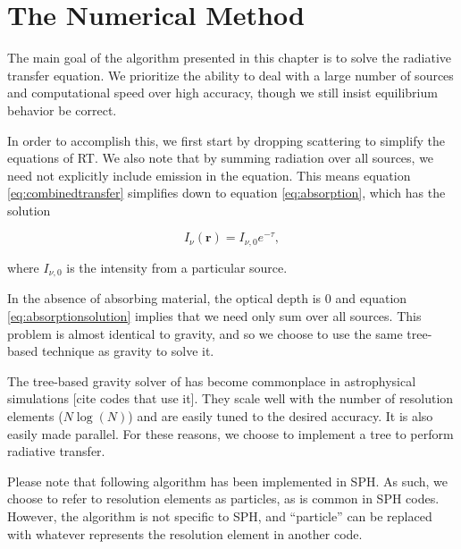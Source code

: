 \pagestyle{fancy}
\headheight 20pt
\chead{}
\lfoot{}
\cfoot{\thepage}
\rfoot{}
\renewcommand{\headrulewidth}{0.1pt}
\renewcommand{\footrulewidth}{0.1pt}

\chapter{The Numerical Method}
\label{chap:method}
\thispagestyle{fancy}

The main goal of the algorithm presented in this chapter is to solve the radiative transfer equation. We prioritize the ability to deal with a large number of sources and computational speed over high accuracy, though we still insist equilibrium behavior be correct.

In order to accomplish this, we first start by dropping scattering to simplify the equations of RT. We also note that by summing radiation over all sources, we need not explicitly include emission in the equation. This means equation \ref{eq:combinedtransfer} simplifies down to equation \ref{eq:absorption}, which has the solution

\begin{equation}
\label{eq:absorptionsolution}
I_{\nu}(\mathbf{r}) = I_{\nu,0}e^{-\tau},
\end{equation}

where $I_{\nu,0}$ is the intensity from a particular source.


In the absence of absorbing material, the optical depth is 0 and equation \ref{eq:absorptionsolution} implies that we need only sum over all sources. This problem is almost identical to gravity, and so we choose to use the same tree-based technique as gravity to solve it.

The tree-based gravity solver of \citet{barnesHut86} has become commonplace in astrophysical simulations \citep{wadsleyEt03}[cite codes that use it]. They scale well with the number of resolution elements ($N\log(N)$) and are easily tuned to the desired accuracy. It is also easily made parallel. For these reasons, we choose to implement a tree to perform radiative transfer.

Please note that following algorithm has been implemented in SPH. As such, we choose to refer to resolution elements as particles, as is common in SPH codes. However, the algorithm is not specific to SPH, and ``particle'' can be replaced with whatever represents the resolution element in another code.

